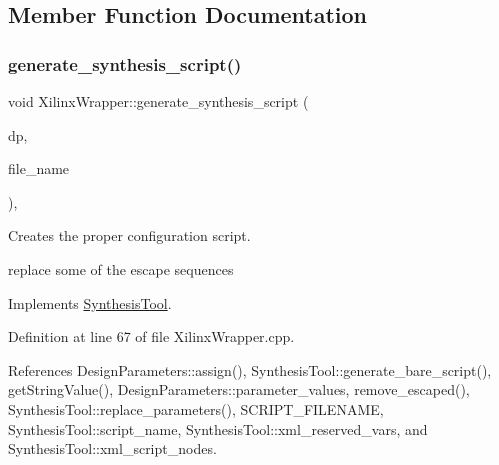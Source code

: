 \subsection{Member Function Documentation}
\mbox{\label{classXilinxWrapper_a535252db25a8a37fd956ee1915c760e2}} 
\subsubsection{\texorpdfstring{generate\+\_\+synthesis\+\_\+script()}{generate\_synthesis\_script()}}
{\footnotesize\ttfamily void Xilinx\+Wrapper\+::generate\+\_\+synthesis\+\_\+script (\begin{DoxyParamCaption}\item[{const \hyperlink{DesignParameters_8hpp_ae36bb1c4c9150d0eeecfe1f96f42d157}{Design\+Parameters\+Ref} \&}]{dp,  }\item[{const std\+::string \&}]{file\+\_\+name }\end{DoxyParamCaption})\hspace{0.3cm}{\ttfamily [override]}, {\ttfamily [virtual]}}



Creates the proper configuration script. 

replace some of the escape sequences 

Implements \hyperlink{classSynthesisTool_ad62c7c8ec82a58b62ee6ca5325ae8e69}{Synthesis\+Tool}.



Definition at line 67 of file Xilinx\+Wrapper.\+cpp.



References Design\+Parameters\+::assign(), Synthesis\+Tool\+::generate\+\_\+bare\+\_\+script(), get\+String\+Value(), Design\+Parameters\+::parameter\+\_\+values, remove\+\_\+escaped(), Synthesis\+Tool\+::replace\+\_\+parameters(), S\+C\+R\+I\+P\+T\+\_\+\+F\+I\+L\+E\+N\+A\+ME, Synthesis\+Tool\+::script\+\_\+name, Synthesis\+Tool\+::xml\+\_\+reserved\+\_\+vars, and Synthesis\+Tool\+::xml\+\_\+script\+\_\+nodes.

